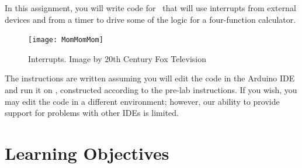 


\usepackage{graphicx}
\usepackage{addfont}
\usepackage{wrapfig}
\usepackage{enumitem}

\renewcommand{\labnumber}{\capstonelabnumber}
\renewcommand{\labname}{Implementing a 4-Function Calculator using Interrupts}
\renewcommand{\shortlabname}{interrupt-driven i/o -- calculator -- grouplab}
\renewcommand{\collaborationrules}{\capstonelabcollaboration}
\renewcommand{\duedate}{\capstonelabdue}
\newcommand{\nano}{\developmentboard} %
\renewcommand{\runtimeenvironment}{\capstonelabenvironment}
\pagelayout

\labidentifier

In this assignment, you will write code for \runtimeenvironment\ that will use
interrupts from external devices and from a timer to drive some of the logic
for a four-function calculator.

\begin{figure}[h]
    \centering
    \texttt{[image: MomMomMom]}
    \caption{Interrupts. \tiny Image by 20th Century Fox Television}
\end{figure}

The instructions are written assuming you will edit the code in the Arduino IDE
and run it on \runtimeenvironment, constructed according to the pre-lab
instructions. If you wish, you may edit the code in a different environment;
however, our ability to provide support for problems with other IDEs is limited.

\section*{Learning Objectives}

